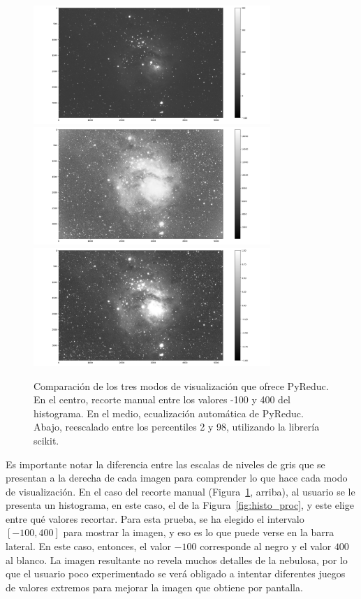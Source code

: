 \documentclass[a4paper, 12pt]{article}
\begin{document}
\begin{figure}[!h]
  \centering
  \includegraphics[width=0.8\textwidth]{img/Figure_Manual.png}
  \includegraphics[width=0.8\textwidth]{img/Figure_Ecualizado.png}
  \includegraphics[width=0.8\textwidth]{img/apiladofinal_scikit.png}
  \caption{\label{fig:visual} Comparación de los tres modos de visualización que ofrece PyReduc. En el centro, recorte manual entre los valores -100 y 400 del histograma. En el medio, ecualización automática de PyReduc. Abajo,  reescalado entre los percentiles 2 y 98, utilizando la librería scikit.}
\end{figure}

Es importante notar la diferencia entre las escalas de niveles de gris que se presentan a la derecha de cada imagen para comprender lo que hace cada modo de visualización. En el caso del recorte manual (Figura~\ref{fig:visual}, arriba), al usuario se le presenta un histograma, en este caso, el de la Figura~\ref{fig:histo_proc}, y este elige entre qué valores recortar. Para esta prueba, se ha elegido el intervalo $[-100,400]$ para mostrar la imagen, y eso es lo que puede verse en la barra lateral. En este caso, entonces, el valor $-100$ corresponde al negro y el valor $400$ al blanco. La imagen resultante no revela muchos detalles de la nebulosa, por lo que el usuario poco experimentado se verá obligado a intentar diferentes juegos de valores extremos para mejorar la imagen que obtiene por pantalla.
\end{document}

